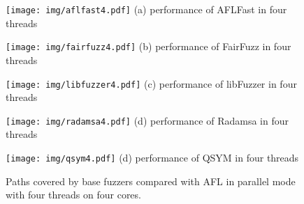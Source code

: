 \begin{figure*}[!htb]
\centering
\begin{minipage}[!htbp]{0.19\textwidth}
     \centering
     \texttt{[image: img/aflfast4.pdf]}
     \small{(a) performance of AFLFast in four threads}
\end{minipage}
\begin{minipage}[!htbp]{0.19\textwidth}
     \centering
     \texttt{[image: img/fairfuzz4.pdf]}     
     \small{(b) performance of FairFuzz in four threads}
\end{minipage}
\begin{minipage}[!htbp]{0.19\textwidth}
     \centering
     \texttt{[image: img/libfuzzer4.pdf]}     
     \small{(c) performance of libFuzzer in four threads}
\end{minipage}
\begin{minipage}[!htbp]{0.19\textwidth}
     \centering
     \texttt{[image: img/radamsa4.pdf]}     
     \small{(d) performance of Radamsa in four threads}
\end{minipage}
\begin{minipage}[!htbp]{0.19\textwidth}
     \centering
     \texttt{[image: img/qsym4.pdf]}     
     \small{(d) performance of QSYM in four threads}
\end{minipage}
\caption{Paths covered by base fuzzers compared with AFL in parallel mode with four threads on four cores.}
\label{fig:paths-AFL4}
\end{figure*}



